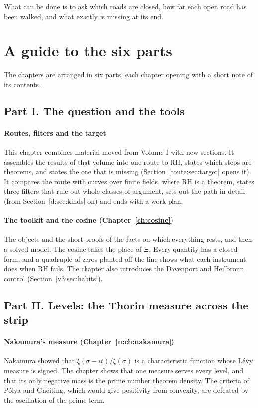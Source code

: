 What can be done is to ask which roads are closed, how far each open road has been walked, and what exactly is missing at its end.

\section{A guide to the six parts}\label{v3:sec:guide}

The chapters are arranged in six parts, each chapter opening with a short note of its contents.

\subsection*{Part I. The question and the tools}

\paragraph{Routes, filters and the target} This chapter combines material moved from Volume I with new sections. It assembles the results of that volume into one route to RH, states which steps are theorems, and states the one that is missing (Section~\ref{route:sec:target} opens it). It compares the route with curves over finite fields, where RH is a theorem, states three filters that rule out whole classes of argument, sets out the path in detail (from Section~\ref{d:sec:kinds} on) and ends with a work plan.

\paragraph{The toolkit and the cosine (Chapter~\ref{ch:cosine})} The objects and the short proofs of the facts on which everything rests, and then a solved model. The cosine takes the place of $\Xi$. Every quantity has a closed form, and a quadruple of zeros planted off the line shows what each instrument does when RH fails. The chapter also introduces the Davenport and Heilbronn control (Section~\ref{v3:sec:habits}).

\subsection*{Part II. Levels: the Thorin measure across the strip}

\paragraph{Nakamura's measure (Chapter~\ref{n:ch:nakamura})} Nakamura showed that $\xi(\sigma-it)/\xi(\sigma)$ is a characteristic function whose L\'evy measure is signed. The chapter shows that one measure serves every level, and that its only negative mass is the prime number theorem density. The criteria of P\'olya and Gneiting, which would give positivity from convexity, are defeated by the oscillation of the prime term.

